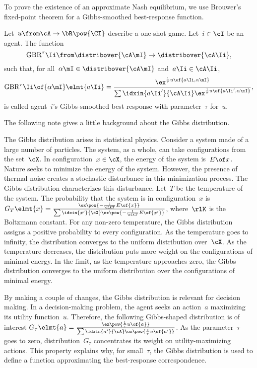 To prove the existence of an approximate Nash equilibrium, we use Brouwer's fixed-point theorem for a Gibbs-smoothed best-response function.

\begin{definition}
\label{def:gibbs-smoothed_best_response}
Let~\(u \from \cA \to \bR\pow{\CI}\) describe a one-shot game.
Let~\(i \in \cI\) be an agent.
The function
\[
\gbr\Ii \from \distribover{\cA\mI} \to \distribover{\cA\Ii},
\]
such that, for all~\(\alpha\mI \in \distribover{\cA\mI}\) and~\(a\Ii \in \cA\Ii\),
\[
\gbr\Ii \of{\alpha\mI} \elmt{a\Ii}
=
\frac{\ex^{\frac{1}{\tau} u \of {a\Ii, \alpha\mI}}}{\sum\idxin{a\Ii'}{\cA\Ii}\ex^{\frac{1}{\tau} u \of {a\Ii', \alpha\mI}}}
,
\]
is called agent~\(i\)'s Gibbs-smoothed best response with parameter~\(\tau\) for~\(u\).
\end{definition}

The following note gives a little background about the Gibbs distribution.

\newcommand{\gibbsExp}[3][]{\ex \pow {#1\frac{1}{#2}#3}}
\newcommand{\gibbs}[7][]{\frac{\gibbsExp[#1]{#2}{#3{#5}#4}}{\sum\idxin{#6}{#7} \gibbsExp[#1]{#2}{#3{#6}#4}}}

\begin{note}
\label{note:gibbs_distribution}
The Gibbs distribution arises in statistical physics.
Consider a system made of a large number of particles.
The system, as a whole, can take configurations from the set~\(\cX\).
In configuration~\(x \in \cX\), the energy of the system is~\(E \of x\).
Nature seeks to minimize the energy of the system.
However, the presence of thermal noise creates a stochastic disturbance in this minimization process.
The Gibbs distribution characterizes this disturbance.
Let~\(T\) be the temperature of the system.
The probability that the system is in configuration~\(x\) is \(G_{T} \elmt{x} = \gibbs[-]{\rlK T}{E \of}{}{x}{x'}{\cX}\), where~\(\rlK\) is the Boltzmann constant.
For any non-zero temperature, the Gibbs distribution assigns a positive probability to every configuration.
As the temperature goes to infinity, the distribution converges to the uniform distribution over~\(\cX\).
As the temperature decreases, the distribution puts more weight on the configurations of minimal energy.
In the limit, as the temperature approaches zero, the Gibbs distribution converges to the uniform distribution over the configurations of minimal energy.

By making a couple of changes, the Gibbs distribution is relevant for decision making.
In a decision-making problem, the agent seeks an action~\(a\) maximizing its utility function~\(u\).
Therefore, the following Gibbs-shaped distribution is of interest \(G_{\tau} \elmt{a} = \gibbs{\tau}{u \of}{}{a}{a'}{\cA}\).
As the parameter~\(\tau\) goes to zero, distribution~\(G_{\tau}\) concentrates its weight on utility-maximizing actions.
This property explains why, for small~\(\tau\), the Gibbs distribution is used to define a function approximating the best-response correspondence.
\end{note}


